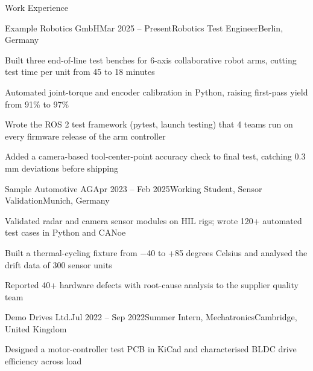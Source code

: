 \documentclass{resume} %
\begin{document}
\begin{rSection}{Work Experience}

\begin{rSubsection}{Example Robotics GmbH}{Mar 2025 -- Present}{Robotics Test Engineer}{Berlin, Germany}
\item Built three end-of-line test benches for 6-axis collaborative robot arms, cutting test time per unit from 45 to 18 minutes
\item Automated joint-torque and encoder calibration in Python, raising first-pass yield from 91\% to 97\%
\item Wrote the ROS 2 test framework (pytest, launch testing) that 4 teams run on every firmware release of the arm controller
\item Added a camera-based tool-center-point accuracy check to final test, catching 0.3\,mm deviations before shipping
\end{rSubsection}

\begin{rSubsection}{Sample Automotive AG}{Apr 2023 -- Feb 2025}{Working Student, Sensor Validation}{Munich, Germany}
\item Validated radar and camera sensor modules on HIL rigs; wrote 120+ automated test cases in Python and CANoe
\item Built a thermal-cycling fixture from $-$40 to +85 degrees Celsius and analysed the drift data of 300 sensor units
\item Reported 40+ hardware defects with root-cause analysis to the supplier quality team
\end{rSubsection}

\begin{rSubsection}{Demo Drives Ltd.}{Jul 2022 -- Sep 2022}{Summer Intern, Mechatronics}{Cambridge, United Kingdom}
\item Designed a motor-controller test PCB in KiCad and characterised BLDC drive efficiency across load
\end{rSubsection}

\end{rSection}
\end{document}

